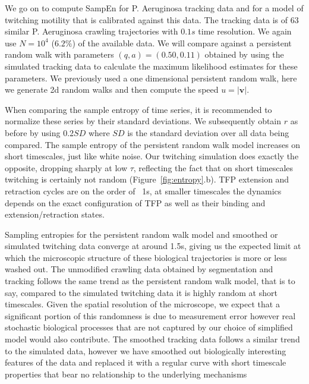 \documentclass{article}
\newcommand{\vct}[1]{\bm{#1}} %
\begin{document}
We go on to compute SampEn for P. Aeruginosa tracking data and for a model of
twitching motility that is calibrated against this data. 
The tracking data is of 63 similar P. Aeruginosa crawling trajectories
with $0.1s$ time resolution. We again use $N = 10^4$ ($6.2\%$) of the 
available data.
We will compare against a persistent random 
walk with parameters $(q,a) = (0.50,0.11)$ obtained by using the 
simulated tracking data to calculate the maximum likelihood estimates for these parameters.
We previously used a one dimensional persistent random walk, here 
we generate 2d random walks and then compute the speed $u = |\vct{v}|$.

When comparing the sample entropy of time series, it is recommended to normalize 
these series by their standard deviations. We subsequently obtain $r$
as before by using 0.2$SD$ where $SD$ is the standard deviation over all
data being compared. The sample entropy of the persistent random walk model
increases on short timescales, just like white noise\cite{costa2002multiscale}.
Our twitching simulation does exactly the opposite, dropping sharply at low
$\tau$, reflecting the fact that on short timescales twitching is certainly not
random (Figure~\ref{fig:entropy}.b).
 TFP extension and retraction cycles are on the order of ~1s, 
at smaller timescales the dynamics depends on the exact configuration
of TFP as well as their binding and extension/retraction states.


Sampling entropies for the persistent random walk model and smoothed or simulated twitching data converge 
at around 1.5s, giving us the expected limit at which the microscopic structure
of these biological trajectories is more or less washed out.
The unmodified crawling data obtained by segmentation and tracking follows the same
trend as the persistent random walk model, that is to say,
compared to the simulated twitching data it is highly random at short timescales. 
Given the spatial resolution of the microscope, we expect that
a significant portion of this randomness is due to measurement error
however real stochastic biological processes that are not captured by 
our choice of simplified model would also contribute.
The smoothed tracking data follows a similar trend to the simulated data,
however we have smoothed out biologically interesting features of the data and 
replaced it with a regular curve with short timescale properties that 
bear no relationship to the underlying mechanisms
\end{document}
